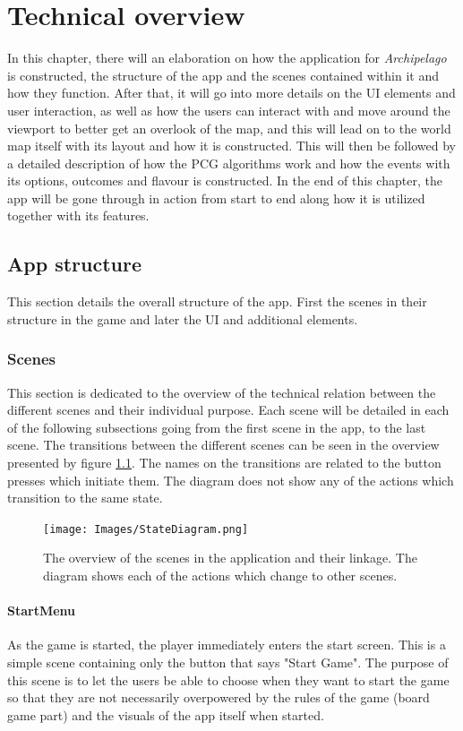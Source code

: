 \chapter{Technical overview}
\label{sec:tech}
In this chapter, there will an elaboration on how the application for \textit{Archipelago} is constructed, the structure of the app and the scenes contained within it and how they function. After that, it will go into more details on the UI elements and user interaction, as well as how the users can interact with and move around the viewport to better get an overlook of the map, and this will lead on to the world map itself with its layout and how it is constructed. This will then be followed by a detailed description of how the PCG algorithms work and how the events with its options, outcomes and flavour is constructed. In the end of this chapter, the app will be gone through in action from start to end along how it is utilized together with its features.

\section{App structure}
This section details the overall structure of the app.
First the scenes in their structure in the game and later the UI and additional elements.

\subsection{Scenes}
\label{sec:scen}
This section is dedicated to the overview of the technical relation between the different scenes and their individual purpose. Each scene will be detailed in each of the following subsections going from the first scene in the app, to the last scene.
The transitions between the different scenes can be seen in the overview presented by figure \ref{fig:appState}. The names on the transitions are related to the button presses which initiate them. 
The diagram does not show any of the actions which transition to the same state.

\begin{figure}[!ht]
    \centering
    \texttt{[image: Images/StateDiagram.png]}
    \caption{The overview of the scenes in the application and their linkage. The diagram shows each of the actions which change to other scenes.}
    \label{fig:appState}
\end{figure}

\subsubsection{StartMenu}
As the game is started, the player immediately enters the start screen. This is a simple scene containing only the button that says "Start Game". The purpose of this scene is to let the users be able to choose when they want to start the game so that they are not necessarily overpowered by the rules of the game (board game part) and the visuals of the app itself when started.


